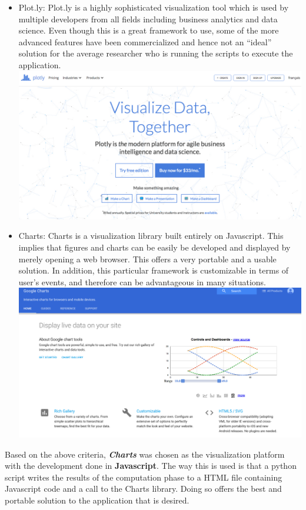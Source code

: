 \begin{itemize}
\begin{itemize}
        \item Plot.ly: Plot.ly is a highly sophisticated visualization tool which is used by multiple developers from all fields including business analytics and data science. Even though this is a great framework to use, some of the more advanced features have been commercialized and hence not an ``ideal'' solution for the average researcher who is running the scripts to execute the application. \newline
        \includegraphics[scale=0.25]{images/plotly}
        
        \item Charts: Charts is a visualization library built entirely on Javascript. This implies that figures and charts can be easily be developed and displayed by merely opening a web browser. This offers a very portable and a usable solution. In addition, this particular framework is customizable in terms of user's events, and therefore can be advantageous in many situations.\newline \newline
        \includegraphics[scale=0.27]{images/charts}
    \end{itemize}
    
    Based on the above criteria, \textbf{\textit{Charts}} was chosen as the visualization platform with the development done in \textbf{Javascript}. The way this is used is that a python script writes the results of the computation phase to a HTML file containing Javascript code and a call to the Charts library. Doing so offers the best and portable solution to the application that is desired.  
        
\end{itemize}

